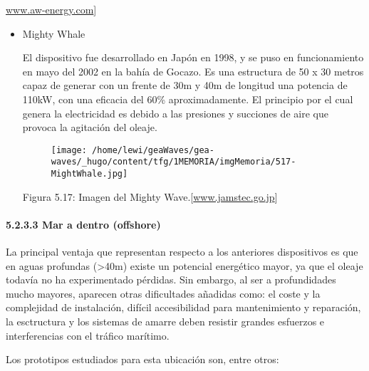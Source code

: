 \href{http://www.aw-energy.com/}{www.aw-energy.com}{]}

\begin{itemize}
\item
  Mighty Whale

  El dispositivo fue desarrollado en Japón en 1998, y se puso en
  funcionamiento en mayo del 2002 en la bahía de Gocazo. Es una
  estructura de 50 x 30 metros capaz de generar con un frente de 30m y
  40m de longitud una potencia de 110kW, con una eficacia del 60\%
  aproximadamente. El principio por el cual genera la electricidad es
  debido a las presiones y succiones de aire que provoca la agitación
  del oleaje.

  \begin{figure}
  \centering
  \texttt{[image: /home/lewi/geaWaves/gea-waves/\_hugo/content/tfg/1MEMORIA/imgMemoria/517-MightWhale.jpg]}
  \caption{}
  \end{figure}

  Figura 5.17: Imagen del Mighty
  Wave.{[}\href{http://www.jamstec.go.jp/}{www.jamstec.go.jp}{]}
\end{itemize}

\paragraph{5.2.3.3 Mar a dentro (offshore)}\label{header-n279}

La principal ventaja que representan respecto a los anteriores
dispositivos es que en aguas profundas (\textgreater{}40m) existe un
potencial energético mayor, ya que el oleaje todavía no ha experimentado
pérdidas. Sin embargo, al ser a profundidades mucho mayores, aparecen
otras dificultades añadidas como: el coste y la complejidad de
instalación, difícil accesibilidad para mantenimiento y reparación, la
esctructura y los sistemas de amarre deben resistir grandes esfuerzos e
interferencias con el tráfico marítimo.

Los prototipos estudiados para esta ubicación son, entre otros:

